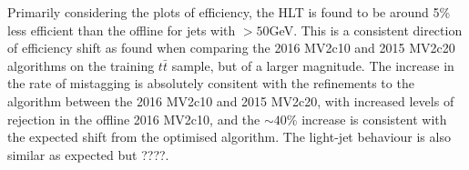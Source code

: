 		Primarily considering the \pt plots of efficiency, the HLT \btag is found to be around 5\% less efficient than the offline \btag for jets with \pt$>50$GeV. This is a consistent direction of efficiency shift as found when comparing the 2016 MV2c10 and 2015 MV2c20 algorithms on the training $t\bar{t}$ sample, but of a larger magnitude. The increase in the rate of \cjet mistagging is absolutely consitent with the refinements to the algorithm between the 2016 MV2c10 and 2015 MV2c20, with increased levels of \cjet rejection in the offline 2016 MV2c10, and the $\sim40$\% increase is consistent with the expected shift from the optimised algorithm. \cite{btagOptimisation} The light-jet behaviour is also similar as expected but ????. 



\endinput
